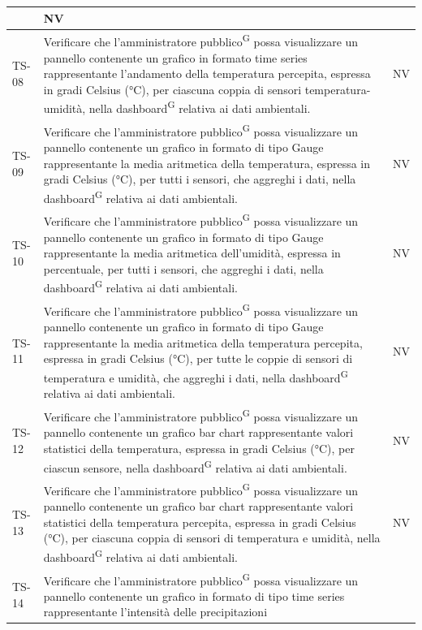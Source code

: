 \documentclass[8pt]{article}
\newcommand{\glossterm}[1]{#1\textsuperscript{G}} %
\begin{document}
\begin{longtable}{|>{\centering}p{2cm}|>{\RaggedRight}m{12cm}|>{\centering\arraybackslash}p{2cm}|}
    & NV \\
    \hline 
    TS-08 & Verificare che l’\glossterm{amministratore pubblico} possa visualizzare un pannello
    contenente un grafico in formato time series rappresentante l'andamento della temperatura
    percepita,
    espressa in gradi Celsius (°C), per ciascuna coppia di sensori temperatura-umidità, nella
    \glossterm{dashboard} relativa ai dati ambientali.
    & NV \\
    \hline
    TS-09 & Verificare che l’\glossterm{amministratore pubblico} possa visualizzare un pannello contenente
    un grafico in formato di tipo Gauge rappresentante la media aritmetica della temperatura,
    espressa in gradi Celsius (°C), per tutti i sensori, che aggreghi i dati, nella \glossterm{dashboard} relativa ai dati ambientali.
    & NV \\
    \hline
    TS-10 & Verificare che l’\glossterm{amministratore pubblico} possa visualizzare un pannello contenente
    un grafico in formato di tipo Gauge rappresentante la media aritmetica dell'umidità,
    espressa in percentuale, per tutti i sensori, che aggreghi i dati, nella \glossterm{dashboard} relativa ai dati ambientali.
    & NV \\
    \hline
    TS-11 & Verificare che l’\glossterm{amministratore pubblico} possa visualizzare un pannello contenente
    un grafico in formato di tipo Gauge rappresentante la media aritmetica della temperatura percepita,
    espressa in gradi Celsius (°C), per tutte le coppie di sensori di temperatura e umidità, che aggreghi i dati, nella \glossterm{dashboard} relativa ai dati ambientali.
    & NV \\
    \hline
    TS-12 & Verificare che l’\glossterm{amministratore pubblico} possa visualizzare un pannello contenente
    un grafico bar chart rappresentante valori statistici della temperatura,
    espressa in gradi Celsius (°C), per ciascun sensore, nella \glossterm{dashboard} relativa ai dati ambientali.
    & NV \\
    \hline
    TS-13 & Verificare che l’\glossterm{amministratore pubblico} possa visualizzare un pannello contenente
    un grafico bar chart rappresentante valori statistici della temperatura percepita,
    espressa in gradi Celsius (°C), per ciascuna coppia di sensori di temperatura e umidità, nella \glossterm{dashboard} relativa ai dati ambientali.
    & NV \\
    \hline
    TS-14 & Verificare che l’\glossterm{amministratore pubblico} possa visualizzare un pannello contenente
    un grafico in formato di tipo time series rappresentante l'intensità delle precipitazioni

\end{longtable}
\end{document}
